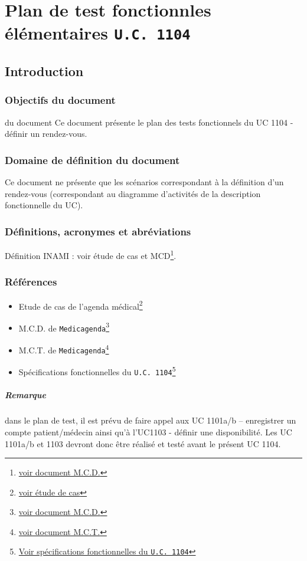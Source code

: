 \documentclass[a4paper, 11pt]{report}
\begin{document}

\tableofcontents
\chapter{Plan de test fonctionnles élémentaires \texttt{U.C. 1104}}
\section{Introduction}
\subsection{Objectifs du document}
du document Ce document présente  le plan des tests fonctionnels du UC 1104 -
définir un rendez-vous. 
\subsection{Domaine de définition du document}
Ce document
ne présente
que les
scénarios
correspondant
à la
définition
d’un
rendez-vous
(correspondant
au diagramme
d’activités
de la
description
fonctionnelle
du UC).
\subsection{Définitions, acronymes et abréviations}
Définition INAMI : voir étude de cas et MCD\footnote{\href{../MCD/MCD.pdf}{voir document M.C.D.}}.
\subsection{Références}
\begin{itemize}
	\item[] Etude de cas de l'agenda
		médical\footnote{\href{../Enonce_Travail_Synthese_14-15.pdf}{voir
		étude de cas}}
	\item[] M.C.D. de \texttt{Medicagenda}\footnote{\href{../MCD/MCD.pdf}{voir document M.C.D.}}
	\item[] M.C.T. de \texttt{Medicagenda}\footnote{\href{./MCT.pdf}{voir document M.C.T.}}
	\item[] Spécifications fonctionnelles du \texttt{U.C.
		1104}\footnote{\href{./specifications_fonctionnelles_UC_1104_definir_un_rendez-vous.pdf}{Voir
			spécifications fonctionnelles du \texttt{U.C. 1104}}}
	\end{itemize}

	\paragraph{Remarque}
	dans le plan de test, il est prévu de faire appel aux UC 1101a/b – enregistrer un compte
	patient/médecin ainsi qu’à l’UC1103 - définir une disponibilité. Les UC 1101a/b et 1103 devront
	donc être réalisé et testé avant le présent UC 1104.
\end{document}
